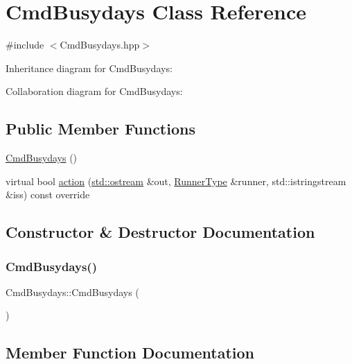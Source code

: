 \hypertarget{classCmdBusydays}{}\section{Cmd\+Busydays Class Reference}
\label{classCmdBusydays}


{\ttfamily \#include $<$Cmd\+Busydays.\+hpp$>$}



Inheritance diagram for Cmd\+Busydays\+:


Collaboration diagram for Cmd\+Busydays\+:
\subsection*{Public Member Functions}
\begin{DoxyCompactItemize}
\item 
\hyperlink{classCmdBusydays_a9afc7fd1152795834b6fd085ae5f0e78}{Cmd\+Busydays} ()
\item 
virtual bool \hyperlink{classCmdBusydays_af53f2b27156a0e94911dd5e6ae4149f8}{action} (\hyperlink{doctest_8h_a116af65cb5e924b33ad9d9ecd7a783f3}{std\+::ostream} \&out, \hyperlink{Command_8hpp_ad45c3de597c2023a8be0399d914161f4}{Runner\+Type} \&runner, std\+::istringstream \&iss) const override
\end{DoxyCompactItemize}


\subsection{Constructor \& Destructor Documentation}
\mbox{\label{classCmdBusydays_a9afc7fd1152795834b6fd085ae5f0e78}} 
\subsubsection{\texorpdfstring{Cmd\+Busydays()}{CmdBusydays()}}
{\footnotesize\ttfamily Cmd\+Busydays\+::\+Cmd\+Busydays (\begin{DoxyParamCaption}{ }\end{DoxyParamCaption})}



\subsection{Member Function Documentation}
\mbox{\label{classCmdBusydays_af53f2b27156a0e94911dd5e6ae4149f8}} 
